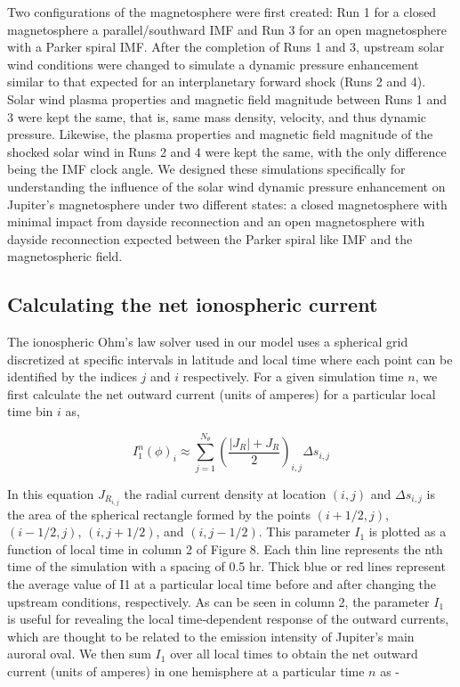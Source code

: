 Two configurations of the magnetosphere were first created: Run 1 for a closed magnetosphere a parallel/southward IMF and Run 3 for an open magnetosphere with a Parker spiral IMF. After the completion of Runs 1 and 3, upstream solar wind conditions were changed to simulate a dynamic pressure enhancement similar to that expected for an interplanetary forward shock (Runs 2 and 4). Solar wind plasma properties and magnetic field magnitude between Runs 1 and 3 were kept the same, that is, same mass density, velocity, and thus dynamic pressure. Likewise, the plasma properties and magnetic field magnitude of the shocked solar wind in Runs 2 and 4 were kept the same, with the only difference being the IMF clock angle. We designed these simulations specifically for understanding the influence of the solar wind dynamic pressure enhancement on Jupiter's magnetosphere under two different states: a closed magnetosphere with minimal impact from dayside reconnection and an open magnetosphere with dayside reconnection expected between the Parker spiral like IMF and the magnetospheric field.

\subsection{Calculating the net ionospheric current}
The ionospheric Ohm's law solver used in our model uses a spherical grid discretized at specific intervals in latitude and local time where each point can be identified by the indices $j$ and $i$ respectively. For a given simulation time $n$, we first calculate the net outward current (units of amperes) for a particular local time bin $i$ as,

\begin{equation}
    I_1^n \left(\phi\right)_i \approx \sum_{j=1}^{N_\theta} \left( \frac{|J_R| + J_R }{2} \right)_{i,j} \Delta s_{i,j}
\end{equation}

In this equation $J_{R_{i,j}}$ the radial current density at location $(i,j)$ and $\Delta s_{i,j}$ is the area of the spherical rectangle formed by the points $(i+1/2,j)$, $(i-1/2,j)$, $(i,j+1/2)$, and $(i,j-1/2)$. This parameter $I_1$ is plotted as a function of local time in column 2 of Figure 8. Each thin line represents the nth time of the simulation with a spacing of 0.5 hr. Thick blue or red lines represent the average value of I1 at a particular local time before and after changing the upstream conditions, respectively. As can be seen in column 2, the parameter $I_1$ is useful for revealing the local time‐dependent response of the outward currents, which are thought to be related to the emission intensity of Jupiter's main auroral oval. We then sum $I_1$ over all local times to obtain the net outward current (units of amperes) in one hemisphere at a particular time $n$ as - 

